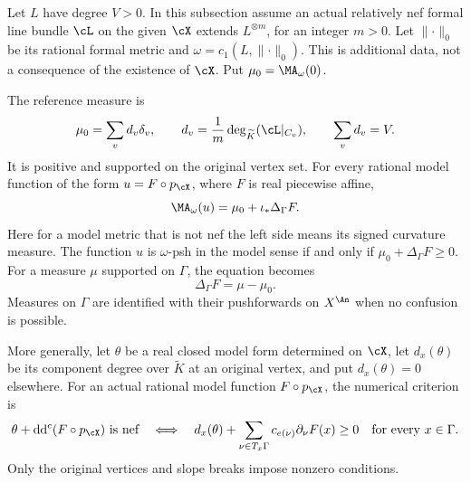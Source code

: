 Let \(L\) have degree \(V>0\).  In this subsection assume an actual
relatively nef formal line bundle \(\cL\) on the given \(\cX\)
extends \(L^{\otimes m}\), for an integer \(m>0\).
Let \(\lVert\cdot\rVert_0\) be its rational formal metric and
\(\omega=c_1(L,\lVert\cdot\rVert_0)\).
This is additional data, not a consequence of the existence of
\(\cX\).  Put \(\mu_0=\MA_\omega(0)\).

\begin{lemma}
\label{lem:ch31-curve-ma-affine}
The reference measure is
\[
 \mu_0=\sum_v d_v\delta_v,\qquad
 d_v=\frac1m\deg_{\widetilde K}(\cL|_{C_v}),\qquad
 \sum_vd_v=V.
\]
It is positive and supported on the original vertex set.
For every rational model function of the form
\(u=F\circ p_{\cX}\), where \(F\) is real piecewise affine,
\begin{equation}
\label{eq:curve-ma-laplacian}
                 \MA_\omega(u)=\mu_0+\iota_*\Delta_\Gamma F.
\end{equation}
Here for a model metric that is not nef the left side means its signed
curvature measure.  The function \(u\) is \(\omega\)-psh in the
model sense if and only if \(\mu_0+\Delta_\Gamma F\geq0\).
For a measure \(\mu\) supported on \(\Gamma\), the equation becomes
\begin{equation}
\label{eq:curve-poisson}
                      \Delta_\Gamma F=\mu-\mu_0 .
\end{equation}
Measures on \(\Gamma\) are identified with their pushforwards on
\(X^{\An}\) when no confusion is possible.

More generally, let \(\theta\) be a real closed model form determined
on \(\cX\), let \(d_x(\theta)\) be its component degree over
\(\widetilde K\) at an original vertex, and put \(d_x(\theta)=0\)
elsewhere.  For an actual rational model function
\(F\circ p_{\cX}\), the numerical criterion is
\begin{equation}
\label{eq:curve-slope-criterion}
 \theta+\mathrm d\mathrm d^c(F\circ p_{\cX})\text{ is nef}
 \quad\Longleftrightarrow\quad
 d_x(\theta)+\sum_{\nu\in T_x\Gamma}
       c_{e(\nu)}\partial_\nu F(x)\geq0
 \quad\text{for every }x\in\Gamma.
\end{equation}
Only the original vertices and slope breaks impose nonzero conditions.
\end{lemma}

